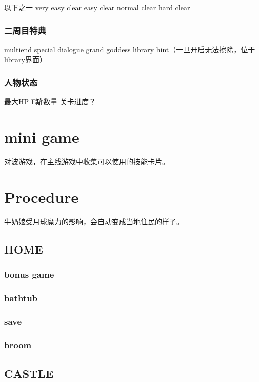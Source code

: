 \documentclass{article}
\begin{document}
以下之一
very easy clear
easy clear
normal clear
hard clear

\subsubsection{二周目特典}

multiend
special dialogue
grand goddess
library hint（一旦开启无法擦除，位于library界面）

\subsubsection{人物状态}

最大HP
E罐数量
关卡进度？

\section{mini game}

对波游戏，在主线游戏中收集可以使用的技能卡片。

\section{Procedure}

牛奶娘受月球魔力的影响，会自动变成当地住民的样子。

\subsection{HOME}

\subsubsection{bonus game}

\subsubsection{bathtub}

\subsubsection{save}

\subsubsection{broom}

\subsection{CASTLE}
\end{document}
